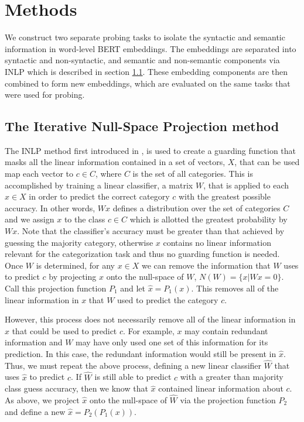 \documentclass[11pt,a4paper]{article}
\begin{document}
\section{Methods}
\label{sec:method}


We construct two separate probing tasks to isolate the syntactic and semantic information in word-level BERT embeddings. The embeddings are separated into syntactic and non-syntactic, and semantic and non-semantic components via INLP which is described in section \ref{sec:inlp-method}. These embedding components are then combined to form new embeddings, which are evaluated on the same tasks that were used for probing. %



\subsection{The Iterative Null-Space Projection method}
\label{sec:inlp-method}

The INLP method first introduced in \citealp{inlp}, is used to create a guarding function that masks all the linear information contained in a set of vectors, $X$, that can be used map each vector to $c \in C$, where $C$ is the set of all categories. This is accomplished by training a linear classifier, a matrix $W$, that is applied to each $x \in X$ in order to predict the correct category $c$ with the greatest possible accuracy. In other words, $Wx$ defines a distribution over the set of categories $C$ and we assign $x$ to the class $c \in C$ which is allotted the greatest probability by $Wx$. Note that the classifier's accuracy must be greater than that achieved by guessing the majority category, otherwise $x$ contains no linear information relevant for the categorization task and thus no guarding function is needed. Once $W$ is determined, for any $x \in X$ we can remove the information that $W$ uses to predict $c$ by projecting $x$ onto the null-space of $W$, $N(W) = \{x | Wx=0\}$. Call this projection function $P_1$ and let $\hat{x} = P_1(x)$. This removes all of the linear information in $x$ that $W$ used to predict the category $c$. 

However, this process does not necessarily remove all of the linear information in $x$ that could be used to predict $c$. For example, $x$ may contain redundant information and $W$ may have only used one set of this information for its prediction. In this case, the redundant information would still be present in $\hat{x}$. Thus, we must repeat the above process, defining a new linear classifier $\hat{W}$ that uses $\hat{x}$  to predict $c$. If $\hat{W}$ is still able to predict $c$ with a greater than majority class guess accuracy, then we know that $\hat{x}$ contained linear information about $c$. As above, we project $\hat{x}$ onto the null-space of $\hat{W}$ via the projection function $P_2$ and define a new $\hat{x} = P_2(P_1(x))$.
\end{document}
